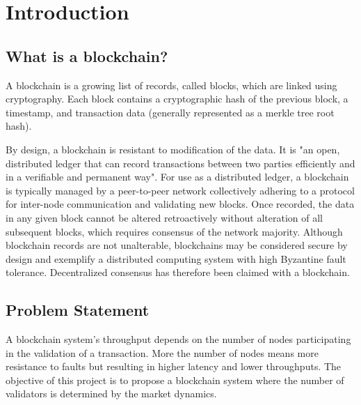 \section{Introduction}

\subsection{What is a blockchain?}

A blockchain is a growing list of records, called blocks, which are linked using cryptography. Each block contains a cryptographic hash of the previous block, a timestamp, and transaction data (generally represented as a merkle tree root hash).

By design, a blockchain is resistant to modification of the data. It is "an open, distributed ledger that can record transactions between two parties efficiently and in a verifiable and permanent way". For use as a distributed ledger, a blockchain is typically managed by a peer-to-peer network collectively adhering to a protocol for inter-node communication and validating new blocks. Once recorded, the data in any given block cannot be altered retroactively without alteration of all subsequent blocks, which requires consensus of the network majority. Although blockchain records are not unalterable, blockchains may be considered secure by design and exemplify a distributed computing system with high Byzantine fault tolerance. Decentralized consensus has therefore been claimed with a blockchain.

\subsection{Problem Statement}

A blockchain system's throughput depends on the number of nodes participating in the validation of a transaction. More the number of nodes means more resistance to faults but resulting in higher latency and lower throughputs. The objective of this project is to propose a blockchain system where the number of validators is determined by the market dynamics.
